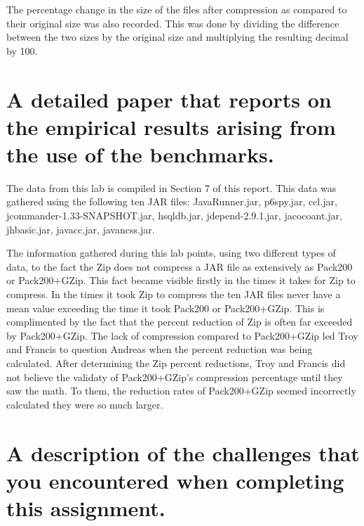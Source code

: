 \documentclass{article}
\begin{document}
\vspace{3mm}

The percentage change in the size of the files after compression as compared to their original size was also recorded. This was done by dividing the difference between the two sizes by the original size and multiplying the resulting decimal by 100.


\section{A detailed paper that reports on the empirical results arising from the use of the benchmarks.}

The data from this lab is compiled in Section 7 of this report. This data was gathered using the following ten JAR files:
JavaRunner.jar,  p6spy.jar, ccl.jar, jcommander-1.33-SNAPSHOT.jar, hsqldb.jar, jdepend-2.9.1.jar, jacocoant.jar, jhbasic.jar, javacc.jar, javancss.jar.


\par
The information gathered during this lab points, using two different types of data, to the fact the Zip does not compress a JAR file as extensively as Pack200 or Pack200+GZip. This fact became visible firstly in the times it takes for Zip to compress. In the times it took Zip to compress the ten JAR files never have a mean value exceeding the time it took Pack200 or Pack200+GZip. This is complimented by the fact that the percent reduction of Zip is often far exceeded by Pack200+GZip. The lack of compression compared to Pack200+GZip led Troy and Francis to question Andreas when the percent reduction was being calculated. After determining the Zip percent reductions, Troy and Francis did not believe the validaty of Pack200+GZip's compression percentage until they saw the math. To them, the reduction rates of Pack200+GZip seemed incorrectly calculated they were so much larger.

\section{A description of the challenges that you encountered when completing this assignment.}
\end{document}
